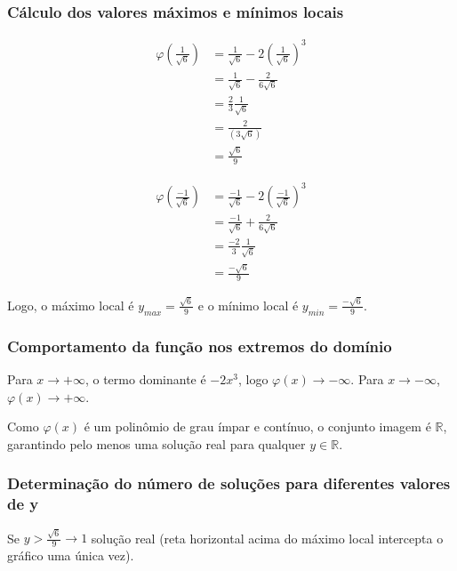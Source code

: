 \documentclass[../resumo.tex]{subfiles}
\begin{document}
	\subsubsection{Cálculo dos valores máximos e mínimos locais}

	\begin{align*}
		\varphi(\frac{1}{\sqrt{6}}) &= \frac{1}{\sqrt{6}} - 2(\frac{1}{\sqrt{6}})^3 \\
																&= \frac{1}{\sqrt{6}} - \frac{2}{6\sqrt{6}} \\
																&= \frac{2}{3}\frac{1}{\sqrt{6}} \\
																&= \frac{2}{(3\sqrt{6})} \\
																&= \frac{\sqrt{6}}{9}
	\end{align*}

	\begin{align*}
		\varphi(\frac{-1}{\sqrt{6}}) &= \frac{-1}{\sqrt{6}} - 2(\frac{-1}{\sqrt{6}})^3 \\
																 &= \frac{-1}{\sqrt{6}} + \frac{2}{6\sqrt{6}} \\
																 &= \frac{-2}{3}\frac{1}{\sqrt{6}} \\
																 &= \frac{-\sqrt{6}}{9}
	\end{align*}

	Logo, o máximo local é $y_{max} = \frac{\sqrt{6}}{9}$ e o mínimo local é $y_{min} = \frac{-\sqrt{6}}{9}$.

	\subsubsection{Comportamento da função nos extremos do domínio}

	Para $x \rightarrow +\infty$, o termo dominante é $-2x^3$, logo $\varphi(x) \rightarrow -\infty$.
	Para $x \rightarrow -\infty$, $\varphi(x) \rightarrow +\infty$.

	Como $\varphi(x)$ é um polinômio de grau ímpar e contínuo, o conjunto imagem é $\mathbb{R}$, garantindo
	pelo menos uma solução real para qualquer $y \in \mathbb{R}$.

	\subsubsection{Determinação do número de soluções para diferentes valores de y}

	Se $y > \frac{\sqrt{6}}{9} \rightarrow 1$ solução real
	(reta horizontal acima do máximo local intercepta o gráfico uma única vez).
\end{document}
